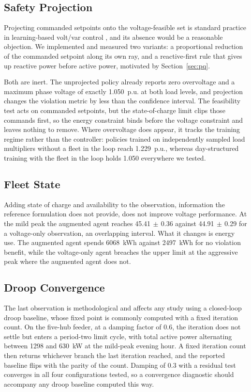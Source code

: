 \documentclass[conference,a4paper]{IEEEtran}
\begin{document}
\subsection{Safety Projection}

Projecting commanded setpoints onto the voltage-feasible set is standard practice in
learning-based volt/var control \cite{wang2020safe,yan2024magrl}, and its absence would be a
reasonable objection. We implemented and measured two variants: a proportional reduction of
the commanded setpoint along its own ray, and a reactive-first rule that gives up reactive
power before active power, motivated by Section~\ref{sec:pq}.

Both are inert. The unprojected policy already reports zero overvoltage and a maximum phase
voltage of exactly 1.050~p.u. at both load levels, and projection changes the violation metric
by less than the confidence interval. The feasibility test acts on commanded setpoints, but the
state-of-charge limit clips those commands first, so the energy constraint binds before the
voltage constraint and leaves nothing to remove. Where overvoltage does
appear, it tracks the training regime rather than the controller: policies trained on
independently sampled load multipliers without a fleet in the loop reach 1.229~p.u., whereas
day-structured training with the fleet in the loop holds 1.050 everywhere we tested.


\subsection{Fleet State}

Adding state of charge and availability to the observation, information the reference
formulation does not provide, does not improve voltage performance. At the mild peak the
augmented agent reaches 45.41$\,\pm\,$0.36 against 44.91$\,\pm\,$0.29 for a voltage-only
observation, an overlapping interval. What it changes is energy use. The augmented agent
spends 6068~kWh against 2497~kWh for no violation benefit, while the voltage-only agent
breaches the upper limit at the aggressive peak where the augmented agent does not.

\subsection{Droop Convergence}

The last observation is methodological and affects any study using a closed-loop droop
baseline, whose fixed point is commonly computed with a fixed iteration count. On the five-hub
feeder, at a damping factor of 0.6, the iteration does not settle but enters a period-two limit
cycle, with total active power alternating between 1298 and 630~kW at the mild-peak evening
hour. A fixed iteration count then returns whichever branch the last iteration reached, and the
reported baseline flips with the parity of the count. Damping of 0.3 with a residual test
converges in all four configurations tested, so a convergence diagnostic should accompany any
droop baseline computed this way.
\end{document}
